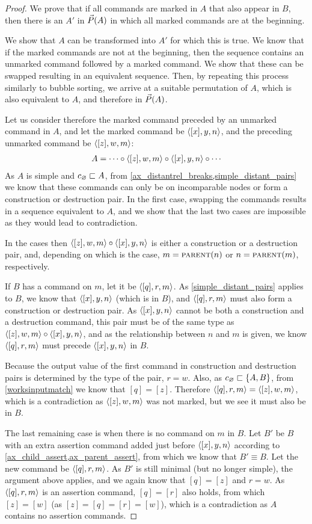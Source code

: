 \begin{proof}
We prove that
if all commands are marked in $A$ that also appear in $B$,
then there is an $A'$ in $\vec{P}({A})$ in which all marked commands are at the beginning.

We show that $A$ can be transformed into $A'$ for which this is true.
We know that if the marked commands are not at the beginning, then
the sequence contains an unmarked command followed by a marked command.
We show that these can be swapped resulting in an equivalent sequence.
Then, by repeating this process similarly to bubble sorting, we arrive at 
a suitable permutation of $A$, which is also equivalent to $A$, and therefore in $\vec{P}({A})$.

Let us consider therefore the marked command preceded by an unmarked command in $A$,
and let the marked command be $\langle{[x],y,n}\rangle$, 
and the preceding unmarked command be $\langle{[z],w,m}\rangle$:
\begin{gather*}
A = \cdots\circ  \langle{[z],w,m}\rangle\circ  \langle{[x],y,n}\rangle\circ  \cdots
\end{gather*}
As $A$ is simple and $c_\varnothing\sqsubset{A}$, from 
\cref{ax_distantrel_breaks,simple_distant_pairs}
we know that these commands can only be on incomparable nodes or form a construction or destruction pair.
In the first case, swapping the commands results in a sequence equivalent to $A$,
and we show that the last two cases are impossible as they would lead to contradiction.

In the cases then $\langle{[z],w,m}\rangle\circ\langle{[x],y,n}\rangle$ is either a construction or a destruction pair,
and, depending on which is the case,
$m=\text{\normalfont\scshape{parent}}(n)$ or $n=\text{\normalfont\scshape{parent}}(m)$, respectively.

If $B$ has a command on $m$, let it be $\langle{[q],r,m}\rangle$.
As \cref{simple_distant_pairs} applies to $B$, we know that
$\langle{[x],y,n}\rangle$ (which is in $B$), and $\langle{[q],r,m}\rangle$ must also form a construction
or destruction pair.
As $\langle{[x],y,n}\rangle$ cannot be both a construction and a destruction command,
this pair must be of the same type as $\langle{[z],w,m}\rangle\circ\langle{[x],y,n}\rangle$,
and as the relationship between $n$ and $m$ is given,
we know $\langle{[q],r,m}\rangle$ must precede $\langle{[x],y,n}\rangle$ in $B$.

Because the output value of the first command in construction
and destruction pairs is determined by the type of the pair,
$r=w$.
Also, as $c_\varnothing\sqsubset{\{{A,B}\}}$, 
from \cref{worksinputmatch}
we know that $[q]=[z]$.
Therefore $\langle{[q],r,m}\rangle=\langle{[z],w,m}\rangle$,
which is a contradiction as $\langle{[z],w,m}\rangle$ was not marked,
but we see it must also be in $B$.

The last remaining case is when there is no command on $m$ in $B$.
Let $B'$ be $B$
with an extra assertion command added just before $\langle{[x],y,n}\rangle$
according to \cref{ax_child_assert,ax_parent_assert}, 
from which we know that $B'\equiv B$.
Let the new command be $\langle{[q],r,m}\rangle$.
As $B'$ is still minimal (but no longer simple),
the argument above applies, and we again know
that $[q]=[z]$ and $r=w$.
As $\langle{[q],r,m}\rangle$ is an assertion command, $[q]=[r]$ also holds,
from which $[z]=[w]$ (as $[z]=[q]=[r]=[w]$), which is a contradiction
as $A$ contains no assertion commands.
\end{proof}

